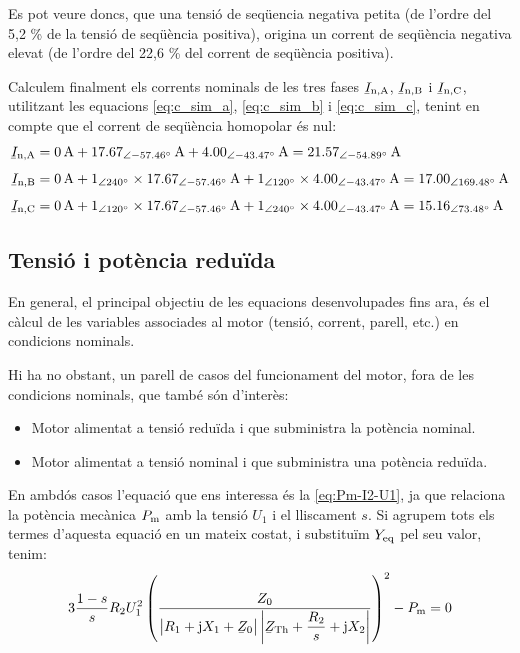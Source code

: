 \begin{exemple}
	Es pot veure doncs, que una tensió de seqüencia negativa petita (de l'ordre del 5,2 \% de la tensió de seqüència positiva), origina un corrent de seqüència negativa elevat (de l'ordre del 22,6 \% del corrent de seqüència positiva). 
	
	Calculem finalment els corrents nominals de les tres fases $\cmplx{I}\ped{n,A}$, $\cmplx{I}\ped{n,B}$ i $\cmplx{I}\ped{n,C}$, utilitzant les equacions \eqref{eq:c_sim_a},
	\eqref{eq:c_sim_b} i \eqref{eq:c_sim_c}, tenint en compte que el corrent de seqüència homopolar és nul:
	\begin{align*}
		\cmplx{I}\ped{n,A} &= \SI{0}{A} + \SIpd{17,67}{-57,46}{A} +
		\SIpd{4,00}{-43,47}{A}  =
		\SIpd{21,57}{-54,89}{A} \\[1ex]
		\cmplx{I}\ped{n,B} &= \SI{0}{A} + \numpd{1}{240} \times
		\SIpd{17,67}{-57,46}{A} + \numpd{1}{120} \times
		\SIpd{4,00}{-43,47}{A}  =
		\SIpd{17,00}{169,48}{A}    \\[1ex]
		\cmplx{I}\ped{n,C} &= \SI{0}{A} + \numpd{1}{120} \times
		\SIpd{17,67}{-57,46}{A} +
		\numpd{1}{240} \times \SIpd{4,00}{-43,47}{A}  =
		\SIpd{15,16}{73,48}{A}
\end{align*}
	
\end{exemple}
	

\subsection{Tensió i potència reduïda}\label{sec:mot-tens-pot-red}

En general, el principal objectiu de les equacions desenvolupades fins ara, és el càlcul de les variables associades al motor (tensió, corrent, parell, etc.) en condicions nominals.

Hi ha no obstant, un parell de casos del funcionament del motor, fora de les condicions nominals, que també són d'interès: 
\begin{itemize}
	\item  Motor alimentat a tensió reduïda i que subministra la potència nominal.
	\item  Motor alimentat a tensió nominal i que subministra una potència reduïda.
\end{itemize}

En ambdós casos l'equació que ens interessa és la \eqref{eq:Pm-I2-U1}, ja que relaciona la potència mecànica $P_\mathrm{m}$ amb la tensió $U_1$ i el lliscament $s$. Si agrupem tots els termes  d'aquesta equació en un mateix costat, i substituïm $Y_\mathrm{eq}$ pel seu valor, tenim:
\begin{equation}
	3 \frac{1-s}{s} R_2 U_1^2 \left( \frac{Z_0}{\big|R_1 + \ju X_1 + \cmplx{Z}_0\big| \left|\cmplx{Z}\ped{Th} + \dfrac{R_2}{s} + \ju X_2\right|} \right)^2 - P\ped{m} = 0 \label{eq:Pm-U1-Yeq}
\end{equation}
	
